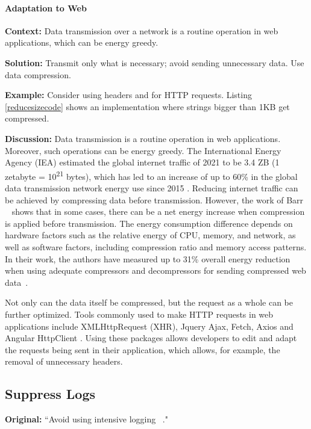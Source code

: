 \paragraph{Adaptation to Web}\mbox{}

\textbf{Context:} Data transmission over a network is a routine operation in web applications, which can be energy greedy.

\textbf{Solution:} Transmit only what is necessary; avoid sending unnecessary data. Use data compression.

\textbf{Example:} Consider using headers  and  for HTTP requests. Listing \ref{reducesizecode} shows an implementation where strings bigger than 1KB get compressed.


\textbf{Discussion:} Data transmission is a routine operation in web applications. Moreover, such operations can be energy greedy. The International Energy Agency (IEA) estimated the global internet traffic of 2021 to be 3.4 ZB (1 zetabyte = 10\textsuperscript{21} bytes), which has led to an increase of up to 60\% in the global data transmission network energy use since 2015 \cite{data-transmission-of-data-centers}. Reducing internet traffic can be achieved by compressing data before transmission. However, the work of Barr \etal ~\cite{Barr2006}  shows that in some cases, there can be a net energy increase when compression is applied before transmission. The energy consumption difference depends on hardware factors such as the relative energy of CPU, memory, and network, as well as software factors, including compression ratio and memory access patterns. In their work, the authors have measured up to 31\% overall energy reduction when using adequate compressors and decompressors for sending compressed web data~\cite{Barr2006}.

Not only can the data itself be compressed, but the request as a whole can be further optimized. Tools commonly used to make HTTP requests in web applications include XMLHttpRequest (XHR), Jquery Ajax, Fetch, Axios and Angular HttpClient \cite{Angular_Http_Client}. Using these packages allows developers to edit and adapt the requests being sent in their application, which allows, for example, the removal of unnecessary headers.



\subsection{Suppress Logs} \label{sec:patterns-SuppressLogs}
\textbf{Original:} ``Avoid using intensive logging ~\cite{cruz2019catalog}."

